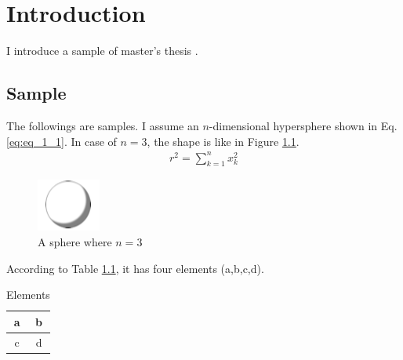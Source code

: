 \chapter{Introduction}

I introduce a sample of master's thesis \cite{taro}.


\section{Sample}

The followings are samples.
I assume an $n$-dimensional hypersphere shown in Eq. \eqref{eq:eq_1_1}.
In case of $n=3$, the shape is like in Figure \ref{fig:ball 1}.
\begin{align}
	r^2 = \sum_{k=1}^n x_k^2
	\label{eq:eq_1_1}
\end{align}
\begin{figure}[h]
	\centering
	\includegraphics[bb=0 0 79 65]{./figures/ball.png}
	\caption{A sphere where $n=3$}
	\label{fig:ball 1}
\end{figure}

According to Table \ref{table:elem 1}, it has four elements (a,b,c,d).
\begin{table}[h]
	\centering
	\begin{tabular}{|c|c|}
		\hline
		a & b \\ \hline
		c & d \\ \hline
	\end{tabular}
	\caption{Elements}
	\label{table:elem 1}
\end{table}


